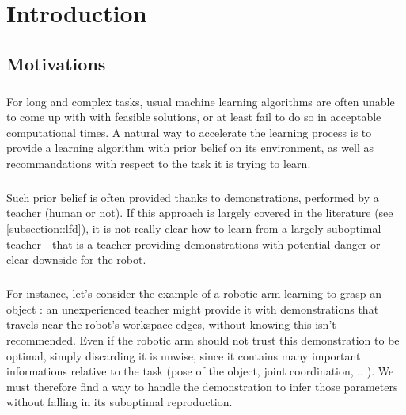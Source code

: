 \documentclass[a4paper]{report}
\begin{document}
	
	
	\tableofcontents
	
	\chapter{Introduction}
	{
		\section{Motivations}
		{
			\paragraph{} For long and complex tasks, usual machine learning algorithms are often unable to come up with with feasible solutions, or at least fail to do so in acceptable computational times. A natural way to accelerate the learning process is to provide a learning algorithm with prior belief on its environment, as well as recommandations with respect to the task it is trying to learn. 
			
			\paragraph{} Such prior belief is often provided thanks to demonstrations, performed by a teacher (human or not). If this approach is largely covered in the literature (see \ref{subsection::lfd}), it is not really clear how to learn from a largely suboptimal teacher - that is a teacher providing demonstrations with potential danger or clear downside for the robot. 
			
			\paragraph{} For instance, let's consider the example of a robotic arm learning to grasp an object : an unexperienced teacher might provide it with demonstrations that travels near the robot's workspace edges, without knowing this isn't recommended. Even if the robotic arm should not trust this demonstration to be optimal, simply discarding it is unwise, since it contains many important informations relative to the task (pose of the object, joint coordination, .. ). We must therefore find a way to handle the demonstration to infer those parameters without falling in its suboptimal reproduction. 
			
}}
\end{document}
